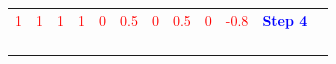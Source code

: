 \documentclass{book}
\begin{document}
\begin{center}
\begin{tabular}{|c|c|c|c|c|c|c|c|c|c|c|c }
        \cline{1-10}
        \textcolor{red}{1} & \textcolor{red}{1} & \textcolor{red}{1} & \textcolor{red}{1} & \textcolor{red}{0} & \textcolor{red}{0.5} & \textcolor{red}{0} & \textcolor{red}{0.5} & \textcolor{red}{0} & \textcolor{red}{-0.8} & \textcolor{blue}{\textbf{Step 4}}\\
        \cline{1-10}
        & & & & & & & & & & \\
        \cline{1-10}
        & & & & & & & & & & \\
        \cline{1-10}
        & & & & & & & & & & \\
        \cline{1-10}
        & & & & & & & & & & \\
        \cline{1-10}
    \end{tabular}
\end{center}
\vspace{1cm}
\\
\end{document}
